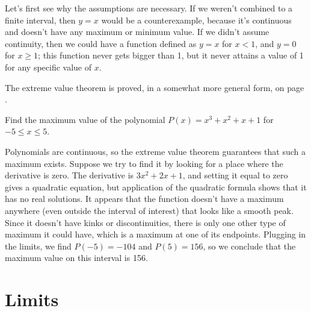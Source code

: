 Let's first see why the assumptions are necessary. If we weren't combined to a finite interval, then
$y=x$ would be a counterexample, because it's continuous and doesn't have any maximum or minimum value.
If we didn't assume continuity, then we could have a function defined as $y=x$ for $x < 1$, and $y=0$ for
$x \ge 1$; this function never gets bigger than 1, but it never attains a value of 1 for any specific value of $x$.

The extreme value theorem is proved, in a somewhat more general form, on page \pageref{detour:extreme-value}.

\pagebreak

\begin{eg}
\egquestion Find the maximum value of the polynomial $P(x)=x^3+x^2+x+1$ for $-5 \le x \le 5$.

\eganswer Polynomials are continuous, so the extreme value theorem guarantees that such a
maximum exists. Suppose we try to find it by looking for a place where the derivative is zero.
The derivative is $3x^2+2x+1$, and setting it equal to zero gives a quadratic equation, but application of the
quadratic formula shows that it has no real solutions. It appears that the function doesn't have a maximum
anywhere (even outside the interval of interest) that looks like a smooth peak. Since it doesn't have kinks or
discontinuities, there is only one other type of maximum it could have, which is a maximum at one
of its endpoints. Plugging in the limits, we find $P(-5)=-104$ and $P(5)=156$, so we conclude that
the maximum value on this interval is 156.
\end{eg}

\vfill\pagebreak

\section{Limits}\label{sec:limits}

